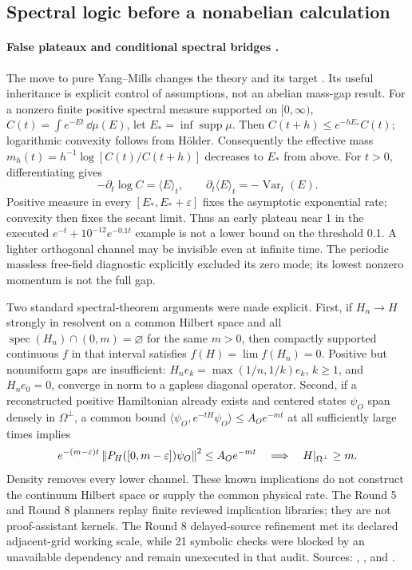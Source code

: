 \subsection{Spectral logic before a nonabelian calculation}
\label{early:spectral}

\paragraph{False plateaux and conditional spectral bridges \workstar.}
The move to pure Yang--Mills changes the theory and its target
\cite{jaffe_witten}.  Its useful
inheritance is explicit control of assumptions, not an abelian mass-gap result.
For a nonzero finite positive spectral measure supported on \([0,\infty)\),
\(C(t)=\int e^{-Et}\,\dd\mu(E)\), let
\(E_*=\inf\operatorname{supp}\mu\).  Then
\(C(t+h)\le e^{-hE_*}C(t)\); logarithmic convexity follows from H\"older.
Consequently the effective mass
\(m_h(t)=h^{-1}\log[C(t)/C(t+h)]\) decreases to \(E_*\) from above.
For \(t>0\), differentiating gives
\begin{equation}
 -\partial_t\log C=\langle E\rangle_t,
 \qquad \partial_t\langle E\rangle_t=-\operatorname{Var}_t(E).
 \label{early:effective}
\end{equation}
Positive measure in every \([E_*,E_*+\varepsilon]\) fixes the asymptotic
exponential rate; convexity then fixes the secant limit.  Thus an early plateau
near 1 in the executed \(e^{-t}+10^{-12}e^{-0.1t}\) example is not a lower
bound on the threshold 0.1.  A lighter orthogonal channel may be invisible
even at infinite time.  The periodic massless free-field diagnostic explicitly
excluded its zero mode; its lowest nonzero momentum is not the full gap.

Two standard spectral-theorem arguments were made explicit.  First, if
\(H_n\to H\) strongly in resolvent on a common Hilbert space and all
\(\operatorname{spec}(H_n)\cap(0,m)=\varnothing\) for the same \(m>0\),
then compactly supported continuous \(f\) in that interval satisfies
\(f(H)=\lim f(H_n)=0\).  Positive but nonuniform gaps are insufficient:
\(H_ne_k=\max(1/n,1/k)e_k\), \(k\ge1\), and \(H_ne_0=0\), converge in
norm to a gapless diagonal operator.  Second, if a reconstructed positive
Hamiltonian already exists and centered states \(\psi_O\) span densely in
\(\Omega^\perp\), a common bound
\(\langle\psi_O,e^{-tH}\psi_O\rangle\le A_Oe^{-mt}\) at all sufficiently
large times implies
\begin{equation}
 e^{-(m-\varepsilon)t}\left\lVert P_H([0,m-\varepsilon])\psi_O\right\rVert^2
 \le A_Oe^{-mt}\quad\Longrightarrow\quad
 H|_{\Omega^\perp}\ge m.
 \label{early:densebridge}
\end{equation}
Density removes every lower channel.  These known implications do not construct
the continuum Hilbert space or supply the common physical rate.  The Round 5
and Round 8 planners replay finite reviewed implication libraries; they are
not proof-assistant kernels.  The Round 8 delayed-source refinement met its
declared adjacent-grid working scale, while 21 symbolic checks were blocked
by an unavailable dependency and remain unexecuted in that audit.  Sources:
,
, and .

